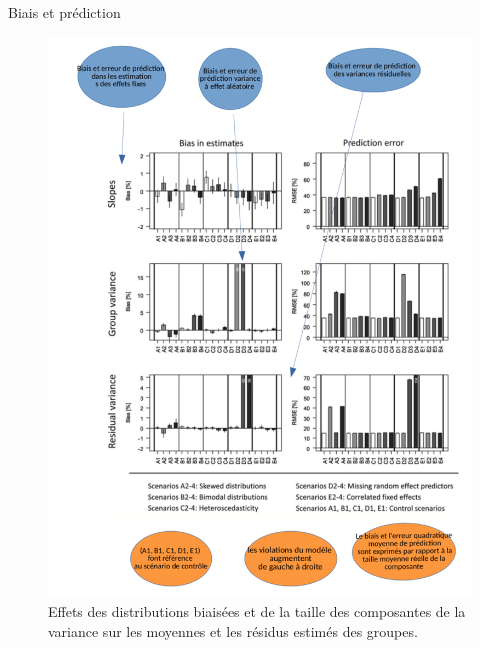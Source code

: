 \documentclass[unknownkeysallowed]{beamer}
\begin{document}
\begin{frame}{Biais et prédiction  }


\begin{figure}
\includegraphics[scale=0.28]{5p.png}
\caption{Effets des distributions biaisées et de la taille des composantes de la variance sur les moyennes et les résidus estimés des groupes.}
\end{figure}
\end{frame}
\end{document}
